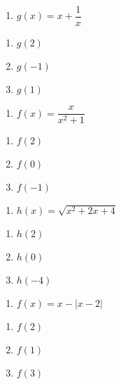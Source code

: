 \documentclass[]{book}
\providecommand{\tightlist}{%
  \setlength{\itemsep}{0pt}\setlength{\parskip}{0pt}}
\theoremstyle{definition}
\theoremstyle{definition}
\theoremstyle{definition}
\theoremstyle{remark}
\begin{document}
\begin{enumerate}
\def\labelenumi{\arabic{enumi}.}
\setcounter{enumi}{2}
\tightlist
\item
  \(g(x)=x+\dfrac{1}{x}\)
\end{enumerate}

\begin{enumerate}
\def\labelenumi{\alph{enumi}.}
\tightlist
\item
  \(g(2)\)
\item
  \(g(-1)\)
\item
  \(g(1)\)
\end{enumerate}

\begin{enumerate}
\def\labelenumi{\arabic{enumi}.}
\setcounter{enumi}{3}
\tightlist
\item
  \(f(x)=\dfrac{x}{x^{2}+1}\)
\end{enumerate}

\begin{enumerate}
\def\labelenumi{\alph{enumi}.}
\tightlist
\item
  \(f(2)\)
\item
  \(f(0)\)
\item
  \(f(-1)\)
\end{enumerate}

\begin{enumerate}
\def\labelenumi{\arabic{enumi}.}
\setcounter{enumi}{4}
\tightlist
\item
  \(h(x)=\sqrt{x^{2}+2x+4}\)
\end{enumerate}

\begin{enumerate}
\def\labelenumi{\alph{enumi}.}
\tightlist
\item
  \(h(2)\)
\item
  \(h(0)\)
\item
  \(h(-4)\)
\end{enumerate}

\begin{enumerate}
\def\labelenumi{\arabic{enumi}.}
\setcounter{enumi}{5}
\tightlist
\item
  \(f(x)=x-\left |x-2 \right |\)
\end{enumerate}

\begin{enumerate}
\def\labelenumi{\alph{enumi}.}
\tightlist
\item
  \(f(2)\)
\item
  \(f(1)\)
\item
  \(f(3)\)
\end{enumerate}
\end{document}
